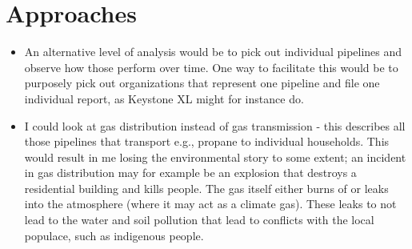 \documentclass[12pt, man, natbib]{apa6}
\begin{document}
	\section{Approaches}
	\begin{itemize}
		\item An alternative level of analysis would be to pick out individual pipelines and observe how those perform over time. One way to facilitate this would be to purposely pick out organizations that represent one pipeline and file one individual report, as Keystone XL might for instance do.
		\item I could look at gas distribution instead of gas transmission - this describes all those pipelines that transport e.g., propane to individual households. This would result in me losing the environmental story to some extent; an incident in gas distribution may for example be an explosion that destroys a residential building and kills people. The gas itself either burns of or leaks into the atmosphere (where it may act as a climate gas). These leaks to not lead to the water and soil pollution that lead to conflicts with the local populace, such as indigenous people.
	\end{itemize}


\end{document}
